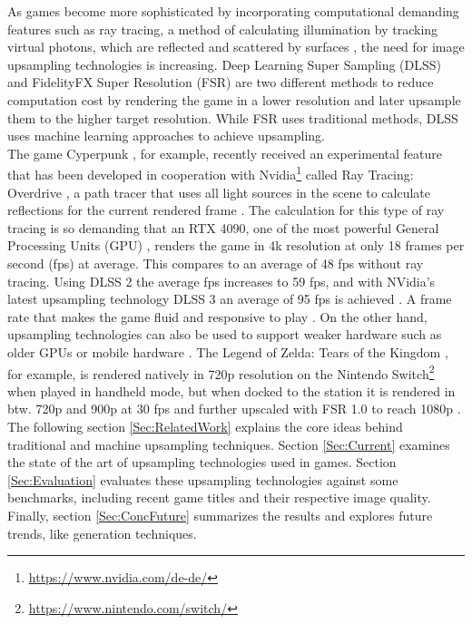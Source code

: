 \documentclass[letterpaper, 10 pt, conference]{ieeeconf}  %
\begin{document}
As games become more sophisticated by incorporating computational demanding features such as ray tracing, a method of calculating illumination by tracking virtual photons, 
which are reflected and scattered by surfaces \cite{ray_tracing}, the need for image upsampling technologies is increasing.
Deep Learning Super Sampling (DLSS) \cite{dlss} and FidelityFX Super Resolution (FSR) \cite{fsr} are two different methods to reduce computation cost 
by rendering the game in a lower resolution and later upsample them to the higher target resolution. 
While FSR uses traditional methods, DLSS uses machine learning approaches to achieve upsampling.\\
The game Cyperpunk \cite{Cyperpunk}, for example, recently received an experimental feature that has been developed in cooperation with Nvidia\footnote{\url{https://www.nvidia.com/de-de/}} 
called Ray Tracing: Overdrive \cite{ray_tracing_overdrive}, a path tracer that uses all light sources in the scene to calculate reflections for the current rendered frame \cite{Shirley2020RTW1}.
The calculation for this type of ray tracing is so demanding that an RTX 4090, 
one of the most powerful General Processing Units (GPU) \cite{4k_gpu_bench}, renders the game in 4k resolution at only 18 frames per second (fps) at average. 
This compares to an average of 48 fps without ray tracing. Using DLSS 2 the average fps increases to 59 fps, and with NVidia's latest upsampling technology DLSS 3 an average of 95 fps is achieved \cite{digital_foundry_ray}. 
A frame rate that makes the game fluid and responsive to play \cite{goodFPS}.
On the other hand, upsampling technologies can also be used to support weaker hardware such as older GPUs or mobile hardware \cite{dong2022rendersr}.
The Legend of Zelda: Tears of the Kingdom \cite{ZeldaTotK}, for example, is rendered natively in 720p resolution on the Nintendo Switch\footnote{\url{https://www.nintendo.com/switch/}} when played in handheld mode, 
but when docked to the station it is rendered in btw. 720p and 900p at 30 fps and further upscaled with FSR 1.0 to reach 1080p \cite{digital_foundry_zelda_fsr}. \\
The following section \ref{Sec:RelatedWork} explains the core ideas behind traditional and machine upsampling techniques.
Section \ref{Sec:Current} examines the state of the art of upsampling technologies used in games.
Section \ref{Sec:Evaluation} evaluates these upsampling technologies against some benchmarks, including recent game titles and their respective image quality.
Finally, section \ref{Sec:ConcFuture} summarizes the results and explores future trends, like generation techniques.
\end{document}
